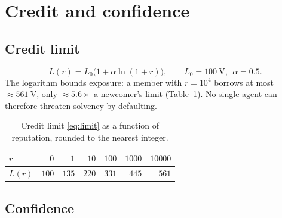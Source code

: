 \documentclass[11pt]{article}
\theoremstyle{plain}
\theoremstyle{definition}
\theoremstyle{remark}
\newcommand{\V}{\mathrm{V}}
\begin{document}
\section{Credit and confidence}\label{sec:confidence}

\subsection{Credit limit}

\begin{equation}\label{eq:limit}
L(r) = L_0\bigl(1 + \alpha \ln(1+r)\bigr), \qquad L_0 = 100~\V,\ \ \alpha = 0.5.
\end{equation}
The logarithm bounds exposure: a member with $r = 10^4$ borrows at most $\approx 561~\V$, only ${\approx}5.6\times$ a newcomer's limit (Table~\ref{tab:limit}). No single agent can therefore threaten solvency by defaulting.

\begin{table}[h]
\centering
\begin{tabular}{lrrrrrr}
\toprule
$r$ & $0$ & $1$ & $10$ & $100$ & $1000$ & $10000$\\
\midrule
$L(r)$ & $100$ & $135$ & $220$ & $331$ & $445$ & $561$\\
\bottomrule
\end{tabular}
\caption{Credit limit \eqref{eq:limit} as a function of reputation, rounded to the nearest integer.}
\label{tab:limit}
\end{table}

\subsection{Confidence}
\end{document}
